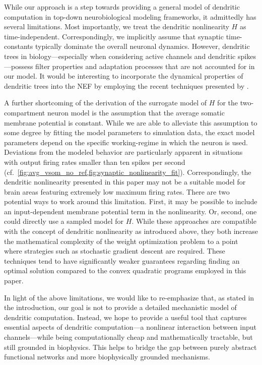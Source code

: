 While our approach is a step towards providing a general model of dendritic computation in top-down neurobiological modeling frameworks, it admittedly has several limitations. Most importantly, we treat the dendritic nonlinearity $H$ as time-independent. Correspondingly, we implicitly assume that synaptic time-constants typically dominate the overall neuronal dynamics. However, dendritic trees in biology---especially when considering active channels and dendritic spikes \citep{koch1999biophysics}---possess filter properties and adaptation processes that are not accounted for in our model. It would be interesting to incorporate the dynamical properties of dendritic trees into the NEF by employing the recent techniques presented by \cite{voelker2018improvinga}.

A further shortcoming of the derivation of the surrogate model of $H$ for the two-compartment neuron model is the assumption that the average somatic membrane potential is constant. While we are able to alleviate this assumption to some degree by fitting the model parameters to simulation data, the exact model parameters depend on the specific working-regime in which the neuron is used. Deviations from the modeled behavior are particularly apparent in situations with output firing rates smaller than ten spikes per second (cf.~\cref{fig:avg_vsom_no_ref,fig:synaptic_nonlinearity_fit}). Correspondingly, the dendritic nonlinearity presented in this paper may not be a suitable model for brain areas featuring extremely low maximum firing rates. There are two potential ways to work around this limitation. First, it may be possible to include an input-dependent membrane potential term in the nonlinearity. Or, second, one could directly use a sampled model for $H$. While these approaches are compatible with the concept of dendritic nonlinearity as introduced above, they both increase the mathematical complexity of the weight optimization problem to a point where strategies such as stochastic gradient descent are required. These techniques tend to have significantly weaker guarantees regarding finding an optimal solution compared to the convex quadratic programs employed in this paper.

In light of the above limitations, we would like to re-emphasize that, as stated in the introduction, our goal is not to provide a detailed mechanistic model of dendritic computation. Instead, we hope to provide a useful tool that captures essential aspects of dendritic computation---a nonlinear interaction between input channels---while being computationally cheap and mathematically tractable, but still grounded in biophysics. This helps to bridge the gap between purely abstract functional networks and more biophysically grounded mechanisms.

